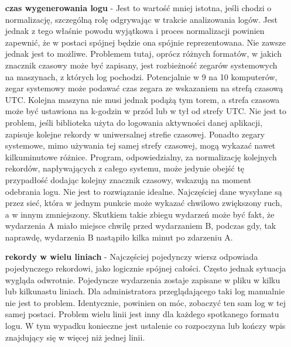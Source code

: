 \begin{itemize}
        \item[\textbf{czas wygenerowania logu}] - Jest to wartość mniej istotna, jeśli chodzi o normalizację, szczególną rolę odgrywając
        w trakcie analizowania logów. Jest jednak z tego właśnie powodu wyjątkowa i proces normalizacji powinien zapewnić, że
        w postaci spójnej będzie ona spójnie reprezentowana. Nie zawsze jednak jest to możliwe. Problemem tutaj, oprócz
        różnych formatów, w jakich znacznik czasowy może być zapisany, jest rozbieżność zegarów systemowych na maszynach,
        z których log pochodzi. Potencjalnie w 9 na 10 komputerów, zegar systemowy może podawać czas zegara ze wskazaniem
        na strefą czasową UTC. Kolejna maszyna nie musi jednak podążą tym torem, a strefa czasowa może być ustawiona
        na k-godzin w przód lub w tył od strefy UTC. Nie jest to problem, jeśli biblioteka użyta do logowania aktywności
        danej aplikacji, zapisuje kolejne rekordy w uniwersalnej strefie czasowej. 
        Ponadto zegary systemowe, mimo używania tej samej strefy czasowej, mogą wykazać nawet kilkuminutowe różnice. 
        Program, odpowiedzialny, za normalizację kolejnych rekordów, napływających z całego systemu, może jedynie
        obejść tę przypadłość dodając kolejny znacznik czasowy, wskazują na moment odebrania logu. 
        Nie jest to rozwiązanie idealne. Najczęściej dane wysyłane są przez sieć, która w jednym punkcie może wykazać chwilowo
        zwiększony ruch, a w innym zmniejszony. Skutkiem takie zbiegu wydarzeń może być fakt, że wydarzenia A miało miejsce
        chwilę przed wydarzaniem B, podczas gdy, tak naprawdę, wydarzenia B nastąpiło kilka minut po zdarzeniu A. 
        
        \item[\textbf{rekordy w wielu liniach}] - Najczęściej pojedynczy wiersz odpowiada pojedynczego rekordowi, jako logicznie
        spójnej całości. Często jednak sytuacja wygląda odwrotnie. Pojedyncze wydarzenia zostaje zapisane w pliku w kilku
        lub kilkunastu liniach. Dla administratora przeglądającego taki log manualnie nie jest to problem. Identycznie, powinien on
        móc, zobaczyć ten sam log w tej samej postaci. Problem wielu linii jest inny dla każdego spotkanego formatu logu.
        W tym wypadku konieczne jest ustalenie co rozpoczyna lub kończy wpis znajdujący się w więcej niż jednej linii. 
        
    \end{itemize}
    
    